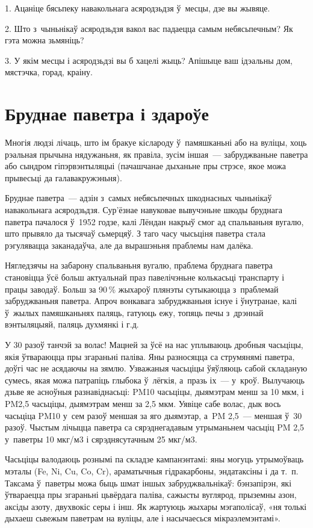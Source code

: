 1. Ацаніце бясьпеку навакольнага асяродзьдзя ў~месцы, дзе вы жывяце.

2. Што з~чыньнікаў асяродзьдзя вакол вас падаецца самым небясьпечным? Як гэта можна зьмяніць?

3. У якім месцы і асяродзьдзі вы б хацелі жыць? Апішыце ваш ідэальны дом, мястэчка, горад, краіну.


\section{Бруднае паветра і здароўе}

Многія людзі лічаць, што ім бракуе кіслароду ў~памяшканьні або на вуліцы, хоць рэальная прычына нядужаньня, як правіла, зусім іншая~--- забруджваньне паветра або сындром гіпэрвэнтыляцыі (пачашчанае дыханьне пры стрэсе, якое можа прывесьці да галавакружэньня).

Бруднае паветра~--- адзін з~самых небясьпечных шкоднасных чыньнікаў навакольнага асяродзьдзя. Сур'ёзнае навуковае вывучэньне шкоды бруднага паветра пачалося ў~1952 годзе, калі Лёндан накрыў смог ад спальваньня вугалю, што прывяло да тысячаў сьмерцяў. З таго часу чысьціня паветра стала рэгулявацца заканадаўча, але да вырашэньня праблемы нам далёка.

Нягледзячы на забарону спальваньня вугалю, праблема бруднага паветра становіцца ўсё больш актуальнай праз павелічэньне колькасьці транспарту і працы заводаў. Больш за 90\,\% жыхароў плянэты сутыкаюцца з~праблемай забруджваньня паветра. Апроч вонкавага забруджваньня існуе і ўнутранае, калі ў~жылых памяшканьнях паляць, гатуюць ежу, топяць печы з~дрэннай вэнтыляцыяй, паляць духмянкі і г.д.

У 30 разоў танчэй за волас! Мацней за ўсё на нас уплываюць дробныя часьціцы, якія ўтвараюцца пры згараньні паліва. Яны разносяцца са струмянямі паветра, доўгі час не асядаючы на зямлю. Узважаныя часьціцы ўяўляюць сабой складаную сумесь, якая можа патрапіць глыбока ў~лёгкія, а~празь іх~--- у~кроў. Вылучаюць дзьве яе асноўныя разнавіднасьці: PM10 часьціцы, дыямэтрам менш за 10 мкм, і PM2,5 часьціцы, дыямэтрам менш за 2,5 мкм. Уявіце сабе волас, дык вось часьціца PM10 у~сем разоў меншая за яго дыямэтар, а~PM 2,5~--- меншая ў~30 разоў. Чыстым лічыцца паветра са сярэднегадавым утрыманьнем часьціц PM 2,5 у~паветры 10 мкг/м3 і сярэднясутачным 25 мкг/м3.

Часьціцы валодаюць рознымі па складзе кампанэнтамі: яны могуць утрымоўваць мэталы (Fe, Ni, Cu, Co, Cr), араматычныя гідракарбоны, эндатаксіны і да т.~п. Таксама ў~паветры можа быць шмат іншых забруджвальнікаў: бэнзапірэн, які ўтвараецца пры згараньні цьвёрдага паліва, сажысты вуглярод, прыземны азон, аксіды азоту, двухвокіс серы і інш. Як жартуюць жыхары мэгаполісаў, «ня толькі дыхаеш сьвежым паветрам на вуліцы, але і насычаесься мікраэлемэнтамі».

